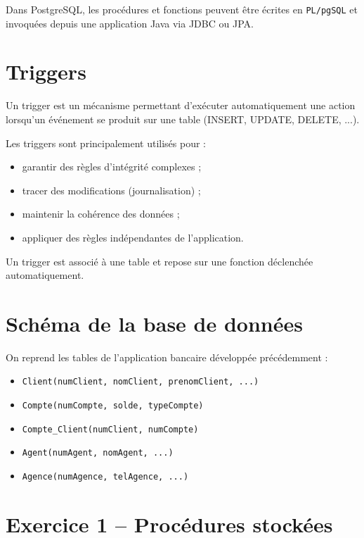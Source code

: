 \documentclass[11pt]{article}
\begin{document}
Dans PostgreSQL, les procédures et fonctions peuvent être écrites en \texttt{PL/pgSQL}
et invoquées depuis une application Java via JDBC ou JPA.

\bigskip

\section*{Triggers}

Un trigger est un mécanisme permettant d’exécuter automatiquement une action
lorsqu’un événement se produit sur une table (INSERT, UPDATE, DELETE, ...).

Les triggers sont principalement utilisés pour :
\begin{itemize}
    \item garantir des règles d’intégrité complexes ;
    \item tracer des modifications (journalisation) ;
    \item maintenir la cohérence des données ;
    \item appliquer des règles indépendantes de l’application.
\end{itemize}

Un trigger est associé à une table et repose sur une fonction déclenchée automatiquement.

\bigskip

\section*{Schéma de la base de données}

On reprend les tables de l’application bancaire développée précédemment :
\begin{itemize}
    \item \texttt{Client(numClient, nomClient, prenomClient, ...)}
    \item \texttt{Compte(numCompte, solde, typeCompte)}
    \item \texttt{Compte\_Client(numClient, numCompte)}
    \item \texttt{Agent(numAgent, nomAgent, ...)}
    \item \texttt{Agence(numAgence, telAgence, ...)}
\end{itemize}

\bigskip

\section*{Exercice 1 -- Procédures stockées}
\end{document}
